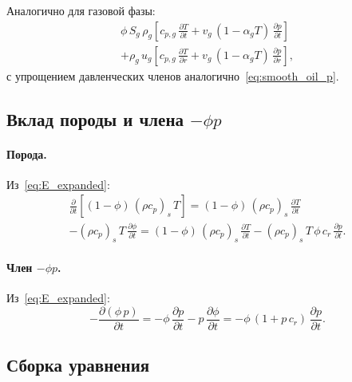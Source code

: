 \documentclass[12pt,a4paper]{article}
\begin{document}
Аналогично для газовой фазы:
\begin{multline}\label{eq:smooth_gas}
  \phi\,S_g\,\rho_g\!\left[
    c_{p,g}\,\frac{\partial T}{\partial t}
    + v_g\,(1-\alpha_g T)\,\frac{\partial p}{\partial t}
  \right] \\
  + \rho_g\,u_g\!\left[
    c_{p,g}\,\frac{\partial T}{\partial r}
    + v_g\,(1-\alpha_g T)\,\frac{\partial p}{\partial r}
  \right],
\end{multline}
с упрощением давленческих членов аналогично~\eqref{eq:smooth_oil_p}.

\subsection{Вклад породы и члена $-\phi p$}\label{ssec:rock_phip}

\paragraph{Порода.}
Из~\eqref{eq:E_expanded}:
\begin{multline}\label{eq:rock_dt}
  \frac{\partial}{\partial t}\!\left[
    (1-\phi)\,(\rho c_p)_s\,T
  \right]
  = (1-\phi)\,(\rho c_p)_s\,\frac{\partial T}{\partial t}
  \\
    - (\rho c_p)_s\,T\,\frac{\partial\phi}{\partial t}
  = (1-\phi)\,(\rho c_p)_s\,\frac{\partial T}{\partial t}
    - (\rho c_p)_s\,T\,\phi\,c_r\,\frac{\partial p}{\partial t}.
\end{multline}

\paragraph{Член $-\phi p$.}
Из~\eqref{eq:E_expanded}:
\begin{equation}\label{eq:phip_dt}
  -\frac{\partial(\phi\,p)}{\partial t}
  = -\phi\,\frac{\partial p}{\partial t}
    - p\,\frac{\partial\phi}{\partial t}
  = -\phi\,(1 + p\,c_r)\,\frac{\partial p}{\partial t}.
\end{equation}

\subsection{Сборка уравнения}\label{ssec:assembly}
\end{document}
